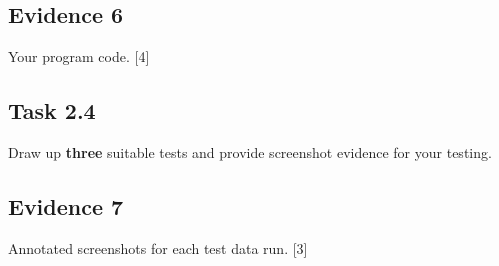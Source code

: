 \subsection*{Evidence 6 }

Your program code.\hfill{} {[}4{]}

\subsection*{Task 2.4 }

Draw up \textbf{three} suitable tests and provide screenshot evidence
for your testing. 

\subsection*{Evidence 7 }

Annotated screenshots for each test data run. \hfill{}{[}3{]}